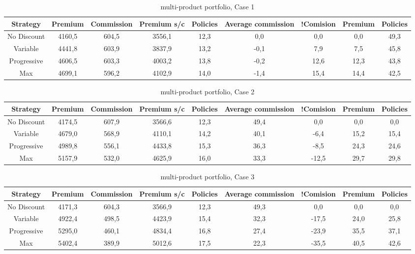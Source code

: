 \documentclass[review]{elsarticle}
\begin{document}
\begin{table}[htb]
\centering
\caption{multi-product portfolio, Case 1}
\label{tab:b5}
\begin{tabular}{c c c c c c c c c}
        \hline
        \hline
        Strategy & Premium & Commission & Premium s/c & Policies & Average commission & !Comision &Premium & Policies \\
        \hline
        No Discount & 4160,5 & 604,5 & 3556,1 & 12,3 & 0,0 & 0,0 & 0,0 & 49,3\\
        \hline
        Variable & 4441,8 & 603,9 & 3837,9 & 13,2 & -0,1 & 7,9 & 7,5 & 45,8 \\
        \hline
        Progressive & 4606,5 & 603,3 & 4003,2 & 13,8 & -0,2 & 12,6 & 12,3 & 43,8 \\
        Max & 4699,1 & 596,2 & 4102,9 & 14,0 & -1,4 & 15,4 & 14,4 & 42,5 \\
        \hline
\end{tabular}
\end{table}

\begin{table}[htb]
\centering
\caption{multi-product portfolio, Case 2}
\label{tab:b5}
\begin{tabular}{c c c c c c c c c}
        \hline
        \hline
        Strategy & Premium & Commission & Premium s/c & Policies & Average commission & !Comision &Premium & Policies \\
        \hline
        No Discount & 4174,5 & 607,9 & 3566,6 & 12,3 & 49,4 & 0,0 & 0,0 & 0,0\\
        \hline
        Variable & 4679,0 & 568,9 & 4110,1 & 14,2 & 40,1 & -6,4 & 15,2 & 15,4 \\
        \hline
        Progressive & 4989,8 & 556,1 & 4433,8 & 15,3 & 36,3 & -8,5 & 24,3 & 24,6 \\
        Max & 5157,9 & 532,0 & 4625,9 & 16,0 & 33,3 & -12,5 & 29,7 & 29,8 \\
        \hline
\end{tabular}
\end{table}

\begin{table}[htb]
\centering
\caption{multi-product portfolio, Case 3}
\label{tab:b5}
\begin{tabular}{c c c c c c c c c}
        \hline
        \hline
        Strategy & Premium & Commission & Premium s/c & Policies & Average commission & !Comision &Premium & Policies \\
        \hline
        No Discount & 4171,3 & 604,3 & 3566,9 & 12,3 & 49,3 & 0,0 & 0,0 & 0,0\\
        \hline
        Variable & 4922,4 & 498,5 & 4423,9 & 15,4 & 32,3 & -17,5 & 24,0 & 25,8 \\
        \hline
        Progressive & 5295,0 & 460,1 & 4834,4 & 16,8 & 27,4 & -23,9 & 35,5 & 37,1 \\
        Max & 5402,4 & 389,9 & 5012,6 & 17,5 & 22,3 & -35,5 & 40,5 & 42,6 \\
        \hline
\end{tabular}
\end{table}
\end{document}
